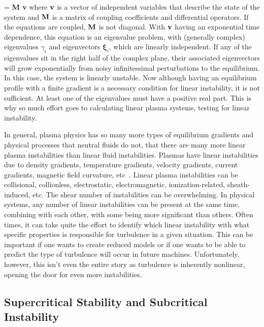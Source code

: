 \beq
\label{dyn_sys_lin}
 = {\bf M v}
\eeq
where ${\bf v}$ is a vector of independent variables that describe the state of the system and ${\bf M}$ is a matrix of coupling coefficients and differential operators. If the equations are
coupled, ${\bf M}$ is not diagonal. With ${\bf v}$ having an exponential time dependence, this equation is an eigenvalue problem, with (generally complex) eigenvalues $\gamma_i$
and eigenvectors $\bm{\xi}_i$, which are linearly independent. If any of the eigenvalues sit in the right half of the complex plane, their associated eigenvectors will grow exponentially
from noisy infinitessimal perturbations to the equilibrium. In this case, the system is linearly unstable. Now although having an equilibrium profile with a finite gradient is a necessary
condition for linear instability, it is not sufficient. At least one of the eigenvalues must have a positive real part. This is why so much effort goes to calculating linear plasma systems,
testing for linear instability.

In general, plasma physics has so many more types of equilibrium gradients and physical processes that neutral fluids do not, that there are many more linear plasma instabilities than
linear fluid instabilities. Plasmas have linear instabilities due to density gradients, temperature gradients, velocity gradients, current gradients, magnetic field curvature, 
etc~\cite{wesson2004,chen2006}. 
Linear plasma instabilities can be collisional, collionless, electrostatic, electromagnetic, ionization-related, sheath-induced, etc. The shear number of instabilities can be overwhelming.
In physical systems, any number of linear instabilities can be present at the same time, combining with each other, with some being more significant than others. Often times, it can take
quite the effort to identify which linear instability with what specific properties is responsible for turbulence in a given situation. This can be important if one wants to create reduced
models or if one wants to be able to predict the type of turbulence will occur in future machines. Unfortunately, however, this isn't even the entire story as turbulence is inherently nonlinear,
opening the door for even more instabilities.

\subsection{Supercritical Stability and Subcritical Instability}
\label{subcritcal_supercritical}

